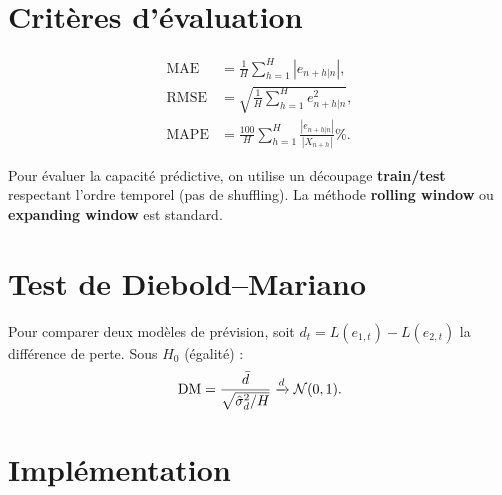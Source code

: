 \section{Crit\`eres d'\'evaluation}

\begin{definition}
\begin{align}
\text{MAE} &= \frac{1}{H}\sum_{h=1}^H|e_{n+h|n}|, \\
\text{RMSE} &= \sqrt{\frac{1}{H}\sum_{h=1}^H e_{n+h|n}^2}, \\
\text{MAPE} &= \frac{100}{H}\sum_{h=1}^H\frac{|e_{n+h|n}|}{|X_{n+h}|}\%.
\end{align}
\end{definition}

\begin{definition}
Pour \'evaluer la capacit\'e pr\'edictive, on utilise un d\'ecoupage \textbf{train/test} respectant l'ordre temporel (pas de shuffling). La m\'ethode \textbf{rolling window} ou \textbf{expanding window} est standard.
\end{definition}

\section{Test de Diebold--Mariano}

\begin{definition}
Pour comparer deux mod\`eles de pr\'evision, soit $d_t = L(e_{1,t})-L(e_{2,t})$ la diff\'erence de perte. Sous $H_0$ (\'egalit\'e) :
\[
\text{DM} = \frac{\bar{d}}{\sqrt{\hat\sigma_d^2/H}} \xrightarrow{d} \mathcal{N}(0,1).
\]
\end{definition}

\section{Impl\'ementation}

